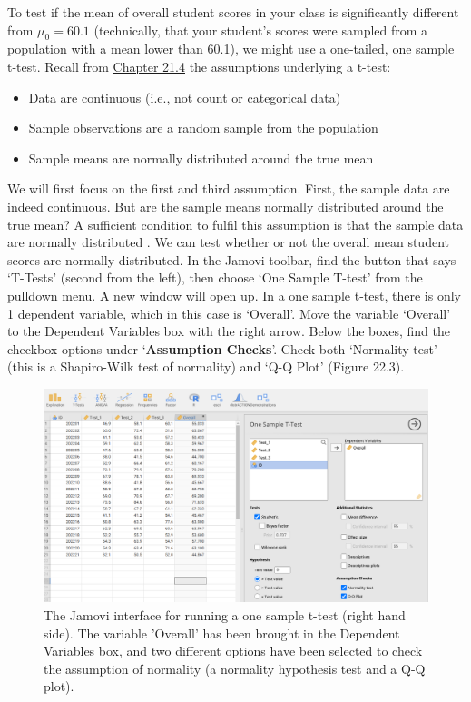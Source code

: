 \documentclass[
]{scrbook}
\providecommand{\tightlist}{%
  \setlength{\itemsep}{0pt}\setlength{\parskip}{0pt}}
\begin{document}
To test if the mean of overall student scores in your class is significantly different from \(\mu_{0} = 60.1\) (technically, that your student's scores were sampled from a population with a mean lower than 60.1), we might use a one-tailed, one sample t-test.
Recall from \protect\hyperlink{assumptions-of-t-tests}{Chapter 21.4} the assumptions underlying a t-test:

\begin{itemize}
\tightlist
\item
  Data are continuous (i.e., not count or categorical data)
\item
  Sample observations are a random sample from the population
\item
  Sample means are normally distributed around the true mean
\end{itemize}

We will first focus on the first and third assumption.
First, the sample data are indeed continuous.
But are the sample means normally distributed around the true mean?
A sufficient condition to fulfil this assumption is that the sample data are normally distributed \citep{Johnson1995, Lumley2002}.
We can test whether or not the overall mean student scores are normally distributed.
In the Jamovi toolbar, find the button that says `T-Tests' (second from the left), then choose `One Sample T-test' from the pulldown menu.
A new window will open up.
In a one sample t-test, there is only 1 dependent variable, which in this case is `Overall'.
Move the variable `Overall' to the Dependent Variables box with the right arrow.
Below the boxes, find the checkbox options under `\textbf{Assumption Checks}'.
Check both `Normality test' (this is a Shapiro-Wilk test of normality) and `Q-Q Plot' (Figure 22.3).

\begin{figure}
\includegraphics[width=1\linewidth]{img/jamovi_one_sample_t-test} \caption{The Jamovi interface for running a one sample t-test (right hand side). The variable 'Overall' has been brought in the Dependent Variables box, and two different options have been selected to check the assumption of normality (a normality hypothesis test and a Q-Q plot).}\label{fig:unnamed-chunk-101}
\end{figure}
\end{document}
